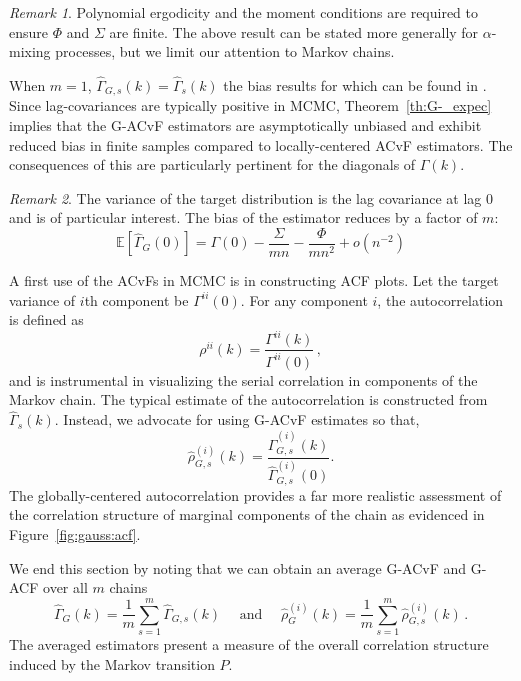 \documentclass[11pt]{article}
\theoremstyle{remark}
\newtheorem{remark}{Remark}
\begin{document}
\begin{remark}
Polynomial ergodicity and the moment conditions are required to ensure $\Phi$ and $\Sigma$ are finite. The above result can be stated more generally for $\alpha$-mixing processes, but we limit our attention to Markov chains. 
\end{remark}


When $m = 1$, $\hat{\Gamma}_{G,s}(k) = \hat{\Gamma}_{s}(k)
$ the bias results for which can be found in \cite{priestley1981spectral}. Since lag-covariances are typically positive in MCMC, Theorem~\ref{th:G-_expec} implies that the G-ACvF estimators are asymptotically unbiased and exhibit reduced bias in finite samples compared to locally-centered ACvF estimators. The consequences of this are particularly pertinent for the diagonals of $\Gamma(k)$.
\begin{remark} \label{rem:lag0_expectation}
The variance of the target distribution is the lag covariance at lag 0 and is of particular interest. The bias of the estimator reduces by a factor of $m$:
\[
\mathbb{E} \left[\hat{\Gamma}_{G}(0) \right] = \Gamma(0) - \dfrac{\Sigma}{mn} - \dfrac{\Phi}{mn^2} + o(n^{-2})
\]
\end{remark}



A first use of the ACvFs in MCMC is in constructing ACF plots. Let the target variance of $i${th} component be $\Gamma^{ii}(0)$. For any component $i$, the autocorrelation is defined as
\[
\rho^{ii}(k) = \dfrac{\Gamma^{ii}(k)}{\Gamma^{ii}(0)}\,,
\]
and is instrumental in visualizing the serial correlation in components of the Markov chain. The typical estimate of the autocorrelation is constructed from $\hat{\Gamma}_s(k)$. Instead, we advocate for using G-ACvF estimates so that,
\[
\hat{\rho}_{G,s}^{(i)}(k) = \dfrac{ \hat{\Gamma}^{(i)}_{G,s} (k)}{\hat{\Gamma}^{(i)}_{G,s} (0)}.
\]
The globally-centered autocorrelation provides a far more realistic assessment of the correlation structure of marginal components of the chain  as evidenced in Figure~\ref{fig:gauss:acf}. 

We end this section by noting that we can obtain an average G-ACvF and G-ACF over all $m$ chains
\[
\hat{\Gamma}_G(k) = \dfrac{1}{m}\sum_{s=1}^m \hat{\Gamma}_{G,s}(k) \quad \text{ and } \quad \hat{\rho}^{(i)}_G(k) = \dfrac{1}{m}\sum_{s=1}^m \hat{\rho}^{(i)}_{G,s}(k)\,.
\]
The averaged estimators present a measure of the overall correlation structure induced by the Markov transition $P$. 
\end{document}
